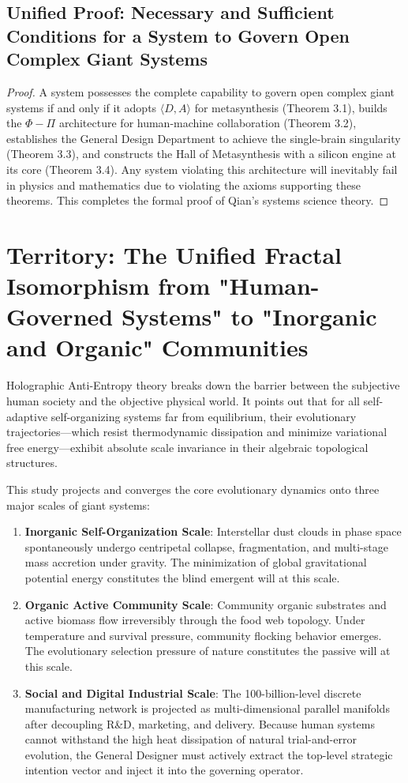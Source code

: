 \documentclass[11pt,a4paper]{article}
\begin{document}
\subsection*{Unified Proof: Necessary and Sufficient Conditions for a System to Govern Open Complex Giant Systems}
\begin{proof}
A system possesses the complete capability to govern open complex giant systems if and only if it adopts $\langle D, A \rangle$ for metasynthesis (Theorem 3.1), builds the $\Phi - \Pi$ architecture for human-machine collaboration (Theorem 3.2), establishes the General Design Department to achieve the single-brain singularity (Theorem 3.3), and constructs the Hall of Metasynthesis with a silicon engine at its core (Theorem 3.4). Any system violating this architecture will inevitably fail in physics and mathematics due to violating the axioms supporting these theorems.
This completes the formal proof of Qian's systems science theory.
\end{proof}

\section{Territory: The Unified Fractal Isomorphism from "Human-Governed Systems" to "Inorganic and Organic" Communities}

Holographic Anti-Entropy theory breaks down the barrier between the subjective human society and the objective physical world. It points out that for all self-adaptive self-organizing systems far from equilibrium, their evolutionary trajectories—which resist thermodynamic dissipation and minimize variational free energy—exhibit absolute scale invariance in their algebraic topological structures.

This study projects and converges the core evolutionary dynamics onto three major scales of giant systems:
\begin{enumerate}
    \item \textbf{Inorganic Self-Organization Scale}: Interstellar dust clouds in phase space spontaneously undergo centripetal collapse, fragmentation, and multi-stage mass accretion under gravity. The minimization of global gravitational potential energy constitutes the blind emergent will at this scale.
    \item \textbf{Organic Active Community Scale}: Community organic substrates and active biomass flow irreversibly through the food web topology. Under temperature and survival pressure, community flocking behavior emerges. The evolutionary selection pressure of nature constitutes the passive will at this scale.
    \item \textbf{Social and Digital Industrial Scale}: The 100-billion-level discrete manufacturing network is projected as multi-dimensional parallel manifolds after decoupling R\&D, marketing, and delivery. Because human systems cannot withstand the high heat dissipation of natural trial-and-error evolution, the General Designer must actively extract the top-level strategic intention vector and inject it into the governing operator.
\end{enumerate}
\end{document}

